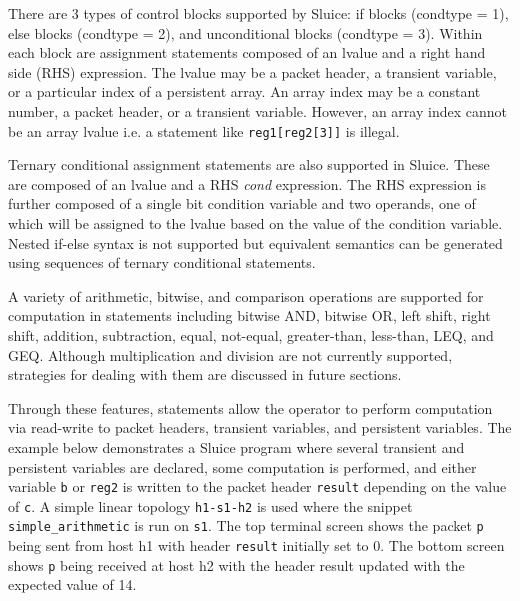 \documentclass[12pt, oneside]{article}
\begin{document}
There are 3 types of control blocks supported by Sluice: if blocks (condtype = 1), else blocks (condtype = 2), and unconditional blocks (condtype = 3). Within each block are assignment statements composed of an lvalue and a right hand side (RHS) expression. The lvalue may be a packet header,  a transient variable, or a particular index of a persistent array. An array index may be a constant number, a packet header, or a transient variable. However, an array index cannot be an array lvalue i.e. a statement like \texttt{reg1[reg2[3]]} is illegal. 

Ternary conditional assignment statements are also supported in Sluice. These are composed of an lvalue and a RHS \textit{cond} expression. The RHS expression is further composed of a single bit condition variable and two operands, one of which will be assigned to the lvalue based on the value of the condition variable. Nested if-else syntax is not supported but equivalent semantics can be generated using sequences of ternary conditional statements. 

A variety of arithmetic, bitwise, and comparison operations are supported for computation in statements including bitwise AND, bitwise OR, left shift, right shift, addition, subtraction, equal, not-equal, greater-than, less-than, LEQ, and GEQ. Although multiplication and division are not currently supported, strategies for dealing with them are discussed in future sections. 

Through these features, statements allow the operator to perform computation via read-write to packet headers, transient variables, and persistent variables. The example below demonstrates a Sluice program where several transient and persistent variables are declared, some computation is performed, and either variable \texttt{b} or \texttt{reg2} is written to the packet header \texttt{result} depending on the value of \texttt{c}. A simple linear topology \texttt{h1-s1-h2} is used where the snippet \texttt{simple\_arithmetic} is run on \texttt{s1}. The top terminal screen shows the packet \texttt{p} being sent from host h1 with header \texttt{result} initially set to 0. The bottom screen shows \texttt{p} being received at host h2 with the header result updated with the expected value of 14.
\end{document}

